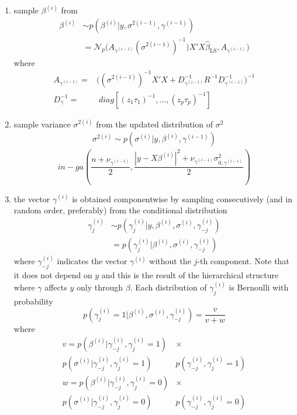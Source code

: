 \documentclass[11 pt]{article}
\begin{document}
\begin{multicols}{2}
\begin{enumerate}[noitemsep]
    \item sample $\beta^{(i)}$ from \begin{align*}\beta^{(i)}&\sim p(\beta^{(i)}|y, \sigma^{2(i-1)}, \gamma^{(i-1)}) \\ &= \mathcal{N}_p\Big(A_{\gamma^{(i-1)}}(\sigma^{2(i-1)})^{-1})X'X \hat{\beta}_{\text{LS}}, A_{\gamma^{(i-1)}}\Big)\end{align*}
    where 
    \begin{align*}
A_{\gamma^{(i-1)}}=&\Big((\sigma^{2(i-1)})^{-1}X'X + D_{\gamma^{(i-1)}}^{-1}R^{-1}D_{\gamma^{(i-1)}}^{-1}\Big)^{-1}\\
D_{\gamma}^{-1}=&\;diag\left[(z_1\tau_1)^{-1},...,(z_p\tau_p)^{-1}\right]
    \end{align*}
    \item sample variance $\sigma^{2(i)}$ from the updated distribution of $\sigma^2$
\begin{align*}
\sigma^{2(i)} \sim  p\left(\sigma^{(i)}|y,\beta^{(i)}, \gamma^{(i-1)}\right)\end{align*}
$$in-ga\left(\frac{n+\nu_{\gamma^{(i-1)}}}{2}, \frac{|y-X\beta^{(i)}|^2 + \nu_{\gamma^{(i-1)}}\sigma^2_{0,\gamma^{(i-1)}}}{2}\right)$$
    \item the vector $\gamma^{(i)}$ is obtained componentwise by sampling consecutively (and in random order, preferably) from the conditional distribution \begin{align*}
        \gamma_j^{(i)} &\sim p\left(\gamma_j^{(i)}|y,\beta^{(i)}, \sigma^{(i)}, \gamma^{(i)}_{-j}\right) \\ & = p\left(\gamma_j^{(i)}|\beta^{(i)}, \sigma^{(i)}, \gamma^{(i)}_{-j}\right)
    \end{align*}
    where $\gamma^{(i)}_{-j}$ indicates the vector $\gamma^{(i)}$ without the $j$-th component. Note that it does not depend on $y$ and this is the result of the hierarchical structure where $\gamma$ affects $y$ only through $\beta$. Each distribution of $\gamma_j^{(i)}$ is Bernoulli with probability $$p\left(\gamma_j^{(i)}=1|\beta^{(i)}, \sigma^{(i)}, \gamma^{(i)}_{-j}\right) = \frac{v}{v+w}$$ where 
    \begin{align*}
    v = p\left(\beta^{(i)}|\gamma^{(i)}_{-j}, \gamma^{(i)}_j = 1\right) &\times\\ p\left(\sigma^{(i)}|\gamma^{(i)}_{-j}, \gamma^{(i)}_j = 1\right) & p\left(\gamma^{(i)}_{-j}, \gamma^{(i)}_j = 1\right)\\
 w=p\left(\beta^{(i)}|\gamma^{(i)}_{-j}, \gamma^{(i)}_j = 0\right) &\times\\ p\left(\sigma^{(i)}|\gamma^{(i)}_{-j}, \gamma^{(i)}_j = 0\right) &p\left(\gamma^{(i)}_{-j}, \gamma^{(i)}_j = 0\right)

\end{align*}
\end{enumerate}
\end{multicols}
\end{document}

